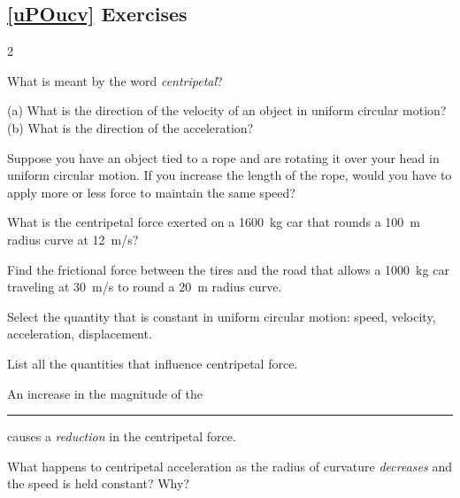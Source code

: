 \documentclass[main.tex]{subfiles}
\begin{document}
\subsection*{\ref{uPOucv} Exercises}
\begin{multicols}{2}
\begin{exercise} \label{x2YCzr}
    What is meant by the word \textit{centripetal}?
\end{exercise}

\begin{exercise} \label{S4rGIt}
    (a) What is the direction of the velocity of an object in uniform circular motion? (b) What is the direction of the acceleration?
\end{exercise}

\begin{exercise} \label{aVu3ZA}
    Suppose you have an object tied to a rope and are rotating it over your head in uniform circular motion. If you increase the length of the rope, would you have to apply more or less force to maintain the same speed?
\end{exercise}

\begin{exercise} \label{DeBjJa}
    What is the centripetal force exerted on a \SI{1600}{kg} car that rounds a \SI{100}{m} radius curve at \SI{12}{m/s}?
\end{exercise}

\begin{exercise} \label{MJm5VE}
    Find the frictional force between the tires and the road that allows a \SI{1000}{kg} car traveling at \SI{30}{m/s} to round a \SI{20}{m} radius curve.
\end{exercise}

\begin{exercise} \label{fsjtBV}
    Select the quantity that is constant in uniform circular motion: speed, velocity, acceleration, displacement.
\end{exercise}

\begin{exercise} \label{GD8Yff}
    List all the quantities that influence centripetal force.
\end{exercise}

\begin{exercise} \label{aEtlVz}
    An increase in the magnitude of the \rule{2cm}{0.15mm} causes a \textit{reduction} in the centripetal force.
\end{exercise}

\begin{exercise} \label{5lauZ6}
    What happens to centripetal acceleration as the radius of curvature \textit{decreases} and the speed is held constant? Why?
\end{exercise}


\end{multicols}
\end{document}
